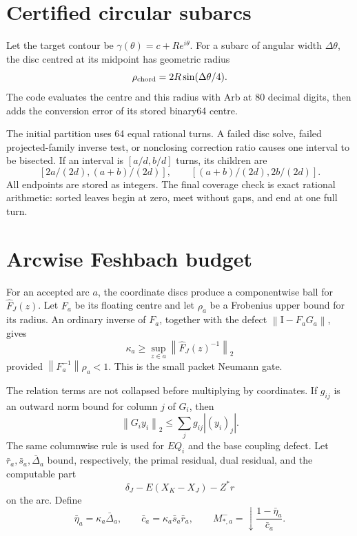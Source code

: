 \documentclass[11pt]{article}
\theoremstyle{definition}
\theoremstyle{remark}
\newcommand{\Id}{\mathrm I}
\newcommand{\norm}[1]{\left\lVert#1\right\rVert}
\newcommand{\absentry}[1]{\left|#1\right|}
\begin{document}
\section{Certified circular subarcs}
\label{sec:geometry}

Let the target contour be $\gamma(\theta)=c+Re^{i\theta}$.  For a subarc of
angular width $\Delta\theta$, the disc centred at its midpoint has geometric
radius
\begin{equation}
 \rho_{\rm chord}=2R\sin(\Delta\theta/4).
 \label{eq:chord-radius}
\end{equation}
The code evaluates the centre and this radius with Arb at 80 decimal digits,
then adds the conversion error of its stored binary64 centre.

The initial partition uses 64 equal rational turns.  A failed disc solve,
failed projected-family inverse test, or nonclosing correction ratio causes
one interval to be bisected.  If an interval is $[a/d,b/d]$ turns, its
children are
\[
 [2a/(2d),(a+b)/(2d)],\qquad
 [(a+b)/(2d),2b/(2d)].
\]
All endpoints are stored as integers.  The final coverage check is exact
rational arithmetic: sorted leaves begin at zero, meet without gaps, and end
at one full turn.

\section{Arcwise Feshbach budget}
\label{sec:budget}

For an accepted arc $a$, the coordinate discs produce a componentwise ball
for $\widehat F_J(z)$.  Let $F_a$ be its floating centre and let $\rho_a$
be a Frobenius upper bound for its radius.  An ordinary inverse of $F_a$,
together with the defect $\norm{\Id-F_aG_a}$, gives
\[
 \kappa_a\geq\sup_{z\in a}\norm{\widehat F_J(z)^{-1}}_2
\]
provided $\norm{F_a^{-1}}\rho_a<1$.  This is the small packet Neumann gate.

The relation terms are not collapsed before multiplying by coordinates.  If
$g_{ij}$ is an outward norm bound for column $j$ of $G_i$, then
\begin{equation}
 \norm{G_i y_i}_2
 \leq\sum_j g_{ij}\absentry{(y_i)_j}.
 \label{eq:column-relation}
\end{equation}
The same columnwise rule is used for $EQ_i$ and the base coupling defect.
Let $\bar r_a,\bar s_a,\bar\Delta_a$ bound, respectively, the primal
residual, dual residual, and the computable part
\[
 \delta_J-E(X_K-X_J)-Z^*r
\]
on the arc.  Define
\begin{equation}
 \bar\eta_a=\kappa_a\bar\Delta_a,\qquad
 \bar c_a=\kappa_a\bar s_a\bar r_a,\qquad
 M_{*,a}^-=\downarrow\frac{1-\bar\eta_a}{\bar c_a}.
 \label{eq:arc-budget}
\end{equation}
\end{document}
